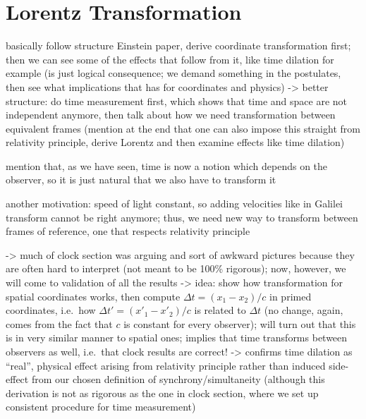 




\newpage



	\section{Lorentz Transformation}
basically follow structure Einstein paper, derive coordinate transformation first; then we can see some of the effects that follow from it, like time dilation for example (is just logical consequence; we demand something in the postulates, then see what implications that has for coordinates and physics) -> better structure: do time measurement first, which shows that time and space are not independent anymore, then talk about how we need transformation between equivalent frames (mention at the end that one can also impose this straight from relativity principle, derive Lorentz and then examine effects like time dilation)


mention that, as we have seen, time is now a notion which depends on the observer, so it is just natural that we also have to transform it


another motivation: speed of light constant, so adding velocities like in Galilei transform cannot be right anymore; thus, we need new way to transform between frames of reference, one that respects relativity principle


-> much of clock section was arguing and sort of awkward pictures because they are often hard to interpret (not meant to be 100\% rigorous); now, however, we will come to validation of all the results -> idea: show how transformation for spatial coordinates works, then compute $\Delta t = (x_1 - x_2) / c$ in primed coordinates, i.e.~how $\Delta t' = (x'_1 - x'_2) / c$ is related to $\Delta t$ (no change, again, comes from the fact that $c$ is constant for every observer); will turn out that this is in very similar manner to spatial ones; implies that time transforms between observers as well, i.e.~that clock results are correct! -> confirms time dilation as \enquote{real}, physical effect arising from relativity principle rather than induced side-effect from our chosen definition of synchrony/simultaneity (although this derivation is not as rigorous as the one in clock section, where we set up consistent procedure for time measurement)





